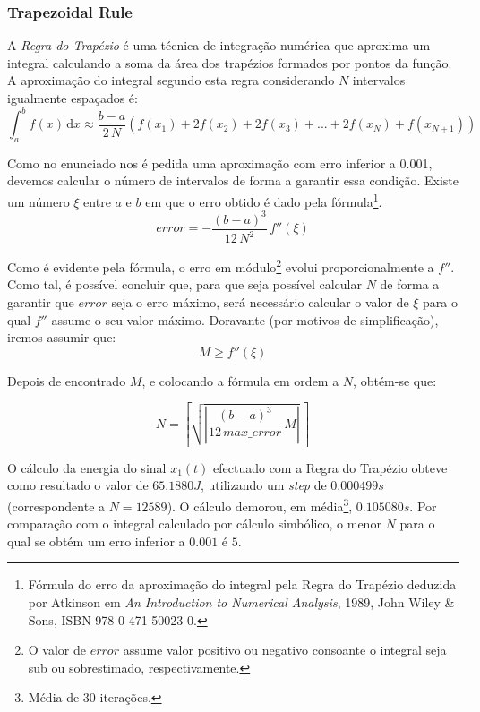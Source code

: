 \documentclass[a4paper]{article}
\begin{document}
\subsubsection{Trapezoidal Rule}
\noindent A \emph{Regra do Trapézio} é uma técnica de integração numérica que aproxima um integral calculando a soma da área dos trapézios formados por pontos da função. A aproximação do integral segundo esta regra considerando $N$ intervalos igualmente espaçados é:
\begin{equation}
\int_{a}^{b} f(x) \, \mathrm{d} x \approx \frac{b-a}{2 \, N} (f(x_{1}) + 2 f(x_{2}) + 2 f(x_{3}) + ... + 2 f(x_{N}) + f(x_{N+1}))
\end{equation}

\noindent Como no enunciado nos é pedida uma aproximação com erro inferior a 0.001, devemos calcular o número de intervalos de forma a garantir essa condição. Existe um número $\xi$ entre $a$ e $b$ em que o erro obtido é dado pela fórmula\footnote{Fórmula do erro da aproximação do integral pela Regra do Trapézio deduzida por Atkinson em \emph{An Introduction to Numerical Analysis}, 1989, John Wiley \& Sons, ISBN 978-0-471-50023-0.}.
\begin{equation}
error = -\frac{(b - a)^3}{12 \, N^2} \, f''(\xi)
\end{equation}

\noindent Como é evidente pela fórmula, o erro em módulo\footnote{O valor de $error$ assume valor positivo ou negativo consoante o integral seja sub ou sobrestimado, respectivamente.} evolui proporcionalmente a $f''$. Como tal, é possível concluir que, para que seja possível calcular $N$ de forma a garantir que $error$ seja o erro máximo, será necessário calcular o valor de $\xi$ para o qual $f''$ assume o seu valor máximo. Doravante (por motivos de simplificação), iremos assumir que:
\begin{equation}
M \ge f''(\xi)
\end{equation}

\noindent Depois de encontrado $M$, e colocando a fórmula em ordem a $N$, obtém-se que:

\begin{equation}
N = \left\lceil \sqrt{\left| \frac{(b - a)^3}{12 \, max\_error} \, M \right|} \, \right\rceil
\end{equation}

O cálculo da energia do sinal $x_{1}(t)$ efectuado com a Regra do Trapézio obteve como resultado o valor de $65.1880 J$, utilizando um \emph{step} de $0.000499s$ (correspondente a $N = 12589$). O cálculo demorou, em média\footnote{Média de 30 iterações.}, $0.105080s$. Por comparação com o integral calculado por cálculo simbólico, o menor $N$ para o qual se obtém um erro inferior a $0.001$ é $5$.
\end{document}
